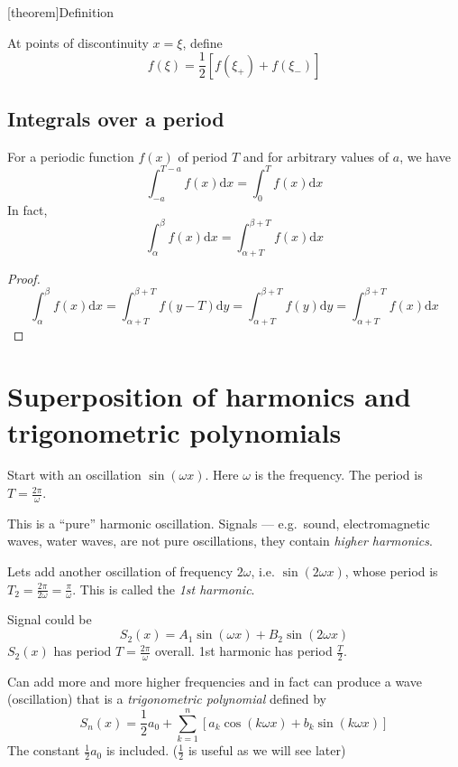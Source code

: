 \documentclass[12pt]{report}
\theoremstyle{definition}
\begin{document}
[theorem]{Definition}
\begin{fn at points of discontinuity}
    At points of discontinuity $x = \xi$, define\[
        f(\xi) = \frac{1}{2} \left[f(\xi_+) + f(\xi_-)\right] 
    \]
\end{fn at points of discontinuity}

\subsection{Integrals over a period}
For a periodic function $f(x)$ of period $T$ and for arbitrary values of $a$, we have \[
    \int_{-a}^{T-a} f(x)\mathrm{d}x = \int_{0}^{T} f(x)\mathrm{d}x
\]
In fact, \[
    \int_{\alpha}^{\beta} f(x)\mathrm{d}x = \int_{\alpha + T}^{\beta + T} f(x)\mathrm{d}x
\]
\begin{proof}
    \[
        \int_{\alpha}^{\beta} f(x)\mathrm{d}x = \int_{\alpha + T}^{\beta + T} f(y-T)\mathrm{d}y 
        = \int_{\alpha + T}^{\beta + T} f(y)\mathrm{d}y = \int_{\alpha + T}^{\beta + T} f(x)\mathrm{d}x
    \]
\end{proof}

\section{Superposition of harmonics and trigonometric polynomials}
Start with an oscillation $\sin{(\omega x)}$. Here $\omega$ is the frequency. The period is $T = \frac{2\pi}{\omega}$.

This is a ``pure'' harmonic oscillation. Signals --- e.g.\ sound, electromagnetic waves, water waves, 
are not pure oscillations, they contain \emph{higher harmonics}.

Lets add another oscillation of frequency $2\omega$, i.e. $\sin{(2\omega x)}$, whose period is 
$T_2 = \frac{2\pi}{2\omega} = \frac{\pi}{\omega}$. This is called the \emph{1st harmonic}.

Signal could be \[
    S_2(x) = A_1\sin{(\omega x)} + B_2\sin{(2\omega x)}
\]
$S_2(x)$ has period $T = \frac{2\pi}{\omega}$ overall. 1st harmonic has period $\frac{T}{2}$.

Can add more and more higher frequencies and in fact can produce a wave (oscillation) that is a 
\emph{trigonometric polynomial} defined by\[
    S_n(x) = \frac{1}{2} a_0 + \sum_{k=1}^{n} [a_k\cos{(k\omega x)} + b_k\sin{(k\omega x)}]
\]
The constant $\frac{1}{2} a_0$ is included. ($\frac{1}{2}$ is useful as we will see later)
\end{document}
